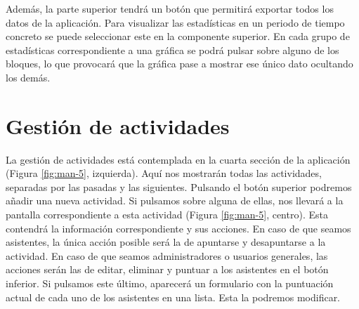 Además, la parte superior tendrá un botón que permitirá exportar todos los datos de la aplicación. Para visualizar las estadísticas en un periodo de tiempo concreto se puede seleccionar este en la componente superior. En cada grupo de estadísticas correspondiente a una gráfica se podrá pulsar sobre alguno de los bloques, lo que provocará que la gráfica pase a mostrar ese único dato ocultando los demás.

\section{Gestión de actividades}

La gestión de actividades está contemplada en la cuarta sección de la aplicación (Figura \ref{fig:man-5}, izquierda). Aquí nos mostrarán todas las actividades, separadas por las pasadas y las siguientes. Pulsando el botón superior podremos añadir una nueva actividad. Si pulsamos sobre alguna de ellas, nos llevará a la pantalla correspondiente a esta actividad (Figura \ref{fig:man-5}, centro). Esta contendrá la información correspondiente y sus acciones. En caso de que seamos asistentes, la única acción posible será la de apuntarse y desapuntarse a la actividad. En caso de que seamos administradores o usuarios generales, las acciones serán las de editar, eliminar y puntuar a los asistentes en el botón inferior. Si pulsamos este último, aparecerá un formulario con la puntuación actual de cada uno de los asistentes en una lista. Esta la podremos modificar.

